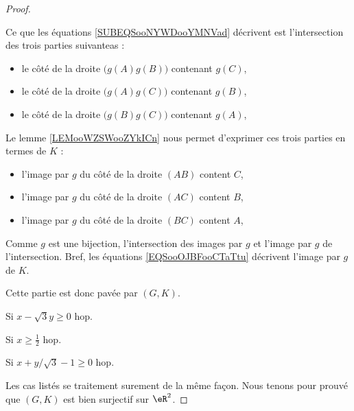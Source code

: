 \begin{proof}
\begin{subproof}
\begin{subproof}
\begin{subproof}
\begin{subequations}
                            \end{subequations}
                            Ce que les équations \eqref{SUBEQSooNYWDooYMNVad} décrivent est l'intersection des trois parties suivanteas :
                            \begin{itemize}
                                \item le côté de la droite \( \big( g(A)g(B)\big)\) contenant \( g(C)\),
                                \item le côté de la droite \( \big( g(A)g(C)\big)\) contenant \( g(B)\),
                                \item le côté de la droite \( \big( g(B)g(C)\big)\) contenant \( g(A)\),
                            \end{itemize}
                            Le lemme \ref{LEMooWZSWooZYkICn} nous permet d'exprimer ces trois parties en termes de \( K\) :
                            \begin{itemize}
                                \item l'image par \( g\) du côté de la droite \( (AB)\) content \( C\),
                                \item l'image par \( g\) du côté de la droite \( (AC)\) content \( B\),
                                \item l'image par \( g\) du côté de la droite \( (BC)\) content \( A\),
                            \end{itemize}
                            Comme \( g\) est une bijection, l'intersection des images par \( g\) et l'image par \( g\) de l'intersection. Bref, les équations \eqref{EQSooOJBFooCTaTtu} décrivent l'image par \( g\) de \( K\).

                            Cette partie est donc pavée par \( (G,K)\).
                        \item[Si \( x-\sqrt{ 3 }y\geq 0\)]
                            hop.
                    \end{subproof}
                     
                \item[Si \( x\geq \frac{ 1 }{2}\)]
                    hop.
            \end{subproof}
        \item[Si \( x+y/\sqrt{ 3 }-1\geq 0\)]
            hop.
    \end{subproof}
    Les cas listés se traitement surement de la même façon. Nous tenons pour prouvé que \( (G,K)\) est bien surjectif sur \( \eR^2\).


\end{proof}
